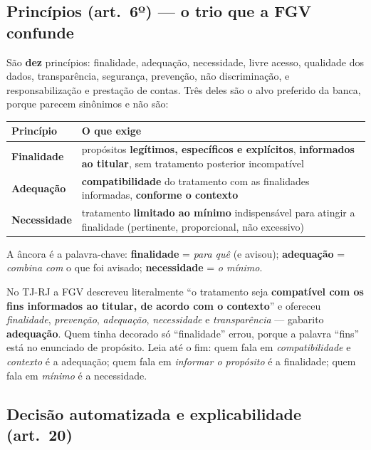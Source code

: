 \subsection{Princípios (art.\ 6º) --- o trio que a FGV confunde}

São \textbf{dez} princípios: finalidade, adequação, necessidade, livre
acesso, qualidade dos dados, transparência, segurança, prevenção, não
discriminação, e responsabilização e prestação de contas. Três deles são o
alvo preferido da banca, porque parecem sinônimos e não são:

\begin{center}
\begin{tabular}{@{}p{2.4cm}p{9cm}@{}}
\toprule
\textbf{Princípio} & \textbf{O que exige} \\
\midrule
\textbf{Finalidade} & propósitos \textbf{legítimos, específicos e explícitos},
\textbf{informados ao titular}, sem tratamento posterior incompatível \\
\textbf{Adequação} & \textbf{compatibilidade} do tratamento com as finalidades
informadas, \textbf{conforme o contexto} \\
\textbf{Necessidade} & tratamento \textbf{limitado ao mínimo} indispensável
para atingir a finalidade (pertinente, proporcional, não excessivo) \\
\bottomrule
\end{tabular}
\end{center}

A âncora é a palavra-chave: \textbf{finalidade} = \emph{para quê} (e avisou);
\textbf{adequação} = \emph{combina com} o que foi avisado; \textbf{necessidade}
= \emph{o mínimo}.

\begin{pegadinha}
No TJ-RJ a FGV descreveu literalmente ``o tratamento seja \textbf{compatível
com os fins informados ao titular, de acordo com o contexto}'' e ofereceu
\emph{finalidade}, \emph{prevenção}, \emph{adequação}, \emph{necessidade} e
\emph{transparência} --- gabarito \textbf{adequação}. Quem tinha decorado só
``finalidade'' errou, porque a palavra ``fins'' está no enunciado de
propósito. Leia até o fim: quem fala em \emph{compatibilidade} e
\emph{contexto} é a adequação; quem fala em \emph{informar o propósito} é a
finalidade; quem fala em \emph{mínimo} é a necessidade.
\end{pegadinha}

\subsection{Decisão automatizada e explicabilidade (art.\ 20)}

